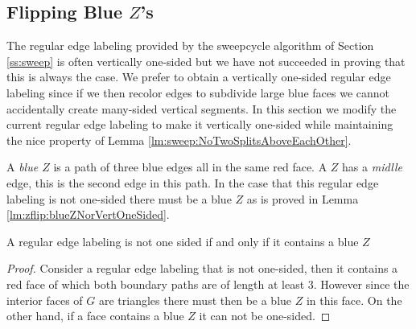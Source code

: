 
\subsection{Flipping Blue $Z$'s}
\thispagestyle{plain}
\label{ss:flipBlueZ}

  The regular edge labeling provided by the sweepcycle algorithm of Section \ref{ss:sweep} is often vertically one-sided but we have not succeeded in proving that this is always the case.
  We prefer to obtain a vertically one-sided regular edge labeling since if we then recolor edges to subdivide large blue faces we cannot accidentally create many-sided vertical segments.
  In this section we modify the current regular edge labeling to make it vertically one-sided while maintaining the nice property of Lemma \ref{lm:sweep:NoTwoSplitsAboveEachOther}.


  A \emph{blue $Z$} is a path of three blue edges all in the same red face. A $Z$ has a \emph{midlle} edge, this is the second edge in this path.
  In the case that this regular edge labeling is not one-sided there must be a blue $Z$ as is proved in Lemma \ref{lm:zflip:blueZNorVertOneSided}.
  \begin{lemma}
    \label{lm:zflip:blueZNorVertOneSided}
    A regular edge labeling is not one sided if and only if it contains a blue $Z$
  \end{lemma}
  \begin{proof}
    Consider a regular edge labeling that is not one-sided, then it contains a red face of which both boundary paths are of length at least $3$. However since the interior faces of $G$ are triangles there must then be a blue $Z$ in this face.
    On the other hand, if a face contains a blue $Z$ it can not be one-sided.
  \end{proof}

